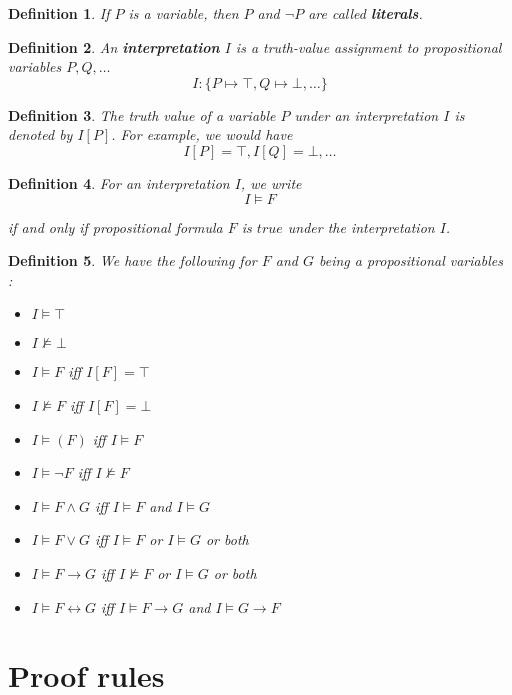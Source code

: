 \documentclass[a4paper,11pt]{report}
\newtheorem*{mydef}{Definition}
\begin{document}
\begin{mydef}
  If $P$ is a variable, then $P$ and $\neg P$ are called \textbf{literals}.
\end{mydef}

\begin{mydef}
  An \textbf{interpretation} $I$ is a truth-value assignment to propositional
  variables $P,Q,\dots$
  \[
    I : \{ P \mapsto \top, Q \mapsto \bot, \dots\}
  \]
\end{mydef}

\begin{mydef}
  The truth value of a variable $P$ under an interpretation $I$ is denoted by
  $I[P]$. For example, we would have
  \[
    I[P] = \top, I[Q] = \bot, \dots
  \]
\end{mydef}

\begin{mydef}
  For an interpretation $I$, we write
  \[
    I \models F
  \]

  if and only if propositional formula $F$ is $true$ under the interpretation
  $I$.
\end{mydef}

\begin{mydef}
  We have the following for $F$ and $G$ being a propositional variables :
  \begin{itemize}
  \item $I \models \top$
  \item $I \not\models \bot$
  \item $ I \models F$ iff $I[F] = \top$
  \item $ I \not\models F$ iff $I[F] = \bot$
  \item $ I \models (F)$ iff $I \models F$
  \item $ I \models \neg F$ iff $I \not\models F$
  \item $ I \models F \wedge G $ iff $I \models F$ and $I \models G$
  \item $ I \models F \vee G $ iff $ I \models F $ or $I \models G$ or both
  \item $ I \models F \to G $ iff $ I \not \models F $ or $I \models G$ or both
  \item $ I \models F \leftrightarrow G $ iff $ I \models F \to G $ and $I
    \models G \to F$
  \end{itemize}
\end{mydef}

\section{Proof rules}
\end{document}
